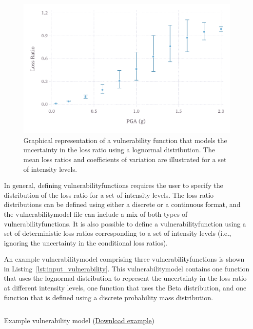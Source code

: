 \begin{figure}[ht]
\centering
\includegraphics[width=12cm]{figures/risk/vulnerability-nonzero-cov.pdf}
\caption{Graphical representation of a vulnerability function that models the uncertainty in the loss ratio using a lognormal distribution. The mean loss ratios and coefficients of variation are illustrated for a set of intensity levels.}
\label{fig:vulnerability-nonzero-cov}
\end{figure}

In general, defining \glspl{vulnerabilityfunction} requires the user to
specify the distribution of the loss ratio for a set of intensity levels. The
loss ratio distributions can be defined using either a discrete or a
continuous format, and the \gls{vulnerabilitymodel} file can include a mix of
both types of \glspl{vulnerabilityfunction}. It is also possible to define a
\gls{vulnerabilityfunction} using a set of deterministic loss ratios
corresponding to a set of intensity levels (i.e., ignoring the uncertainty in
the conditional loss ratios).

An example \gls{vulnerabilitymodel} comprising three
\glspl{vulnerabilityfunction} is shown in
Listing~\ref{lst:input_vulnerability}. This \gls{vulnerabilitymodel} contains
one function that uses the lognormal distribution to represent the uncertainty
in the loss ratio at different intensity levels, one function that uses the
Beta distribution, and one function that is defined using a discrete
probability mass distribution.

\begin{listing}[htbp]
  \inputminted[firstline=1,firstnumber=1,fontsize=\footnotesize,frame=single,linenos,bgcolor=lightgray]{xml}{oqum/risk/Verbatim/input_vulnerability.xml}
  \caption{Example vulnerability model (\href{https://raw.githubusercontent.com/GEMScienceTools/oq-engine-docs/master/oqum/risk/verbatim/input_vulnerability.xml}{Download example})}
  \label{lst:input_vulnerability}
\end{listing}


